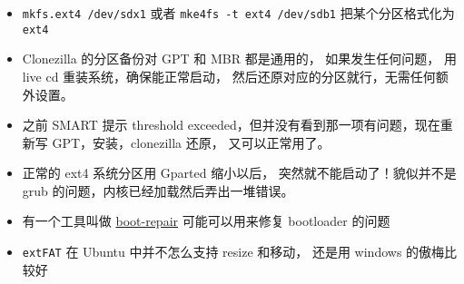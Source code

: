 \begin{itemize}
\item \verb|mkfs.ext4 /dev/sdx1| 或者 \verb|mke4fs -t ext4 /dev/sdb1| 把某个分区格式化为 \verb|ext4|
\item Clonezilla 的分区备份对 GPT 和 MBR 都是通用的， 如果发生任何问题， 用 live cd 重装系统，确保能正常启动， 然后还原对应的分区就行，无需任何额外设置。
\item 之前 SMART 提示 threshold exceeded，但并没有看到那一项有问题，现在重新写 GPT，安装，clonezilla 还原， 又可以正常用了。
\item  正常的 ext4 系统分区用 Gparted 缩小以后， 突然就不能启动了！貌似并不是 grub 的问题，内核已经加载然后弄出一堆错误。
\item 有一个工具叫做 \href{https://help.ubuntu.com/community/Boot-Repair}{boot-repair} 可能可以用来修复 bootloader 的问题
\item \verb|extFAT| 在 Ubuntu 中并不怎么支持 resize 和移动， 还是用 windows 的傲梅比较好
\end{itemize}

